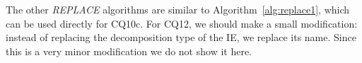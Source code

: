 The other \emph{REPLACE} algorithms are similar to Algorithm~\ref{alg:replace1}, which can be used directly for CQ10c. For CQ12, we should make a small modification: instead of replacing the decomposition type of the IE, we replace its name. Since this is a very minor modification we do not show it here.